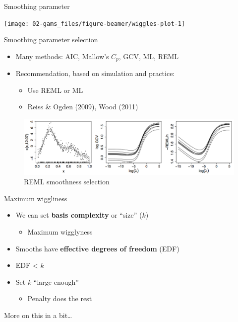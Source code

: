 \documentclass[10pt,ignorenonframetext,compress, aspectratio=169]{beamer}
\providecommand{\tightlist}{%
  \setlength{\itemsep}{0pt}\setlength{\parskip}{0pt}}
\begin{document}
\begin{frame}{Smoothing parameter}

\begin{center}\texttt{[image: 02-gams\_files/figure-beamer/wiggles-plot-1]} \end{center}

\end{frame}

\begin{frame}{Smoothing parameter selection}

\begin{itemize}
\tightlist
\item
  Many methods: AIC, Mallow's \(C_p\), GCV, ML, REML
\item
  Recommendation, based on simulation and practice:

  \begin{itemize}
  \tightlist
  \item
    Use REML or ML
  \item
    Reiss \& Ogden (2009), Wood (2011)
  \end{itemize}
\end{itemize}

\begin{figure}[htbp]
\centering
\includegraphics{remlgcv.png}
\caption{REML smoothness selection}
\end{figure}

\end{frame}

\begin{frame}{Maximum wiggliness}

\begin{itemize}
\tightlist
\item
  We can set \textbf{basis complexity} or ``size'' (\(k\))

  \begin{itemize}
  \tightlist
  \item
    Maximum wigglyness
  \end{itemize}
\item
  Smooths have \textbf{effective degrees of freedom} (EDF)
\item
  EDF \textless{} \(k\)
\item
  Set \(k\) ``large enough''

  \begin{itemize}
  \tightlist
  \item
    Penalty does the rest
  \end{itemize}
\end{itemize}

More on this in a bit\ldots{}

\end{frame}
\end{document}

